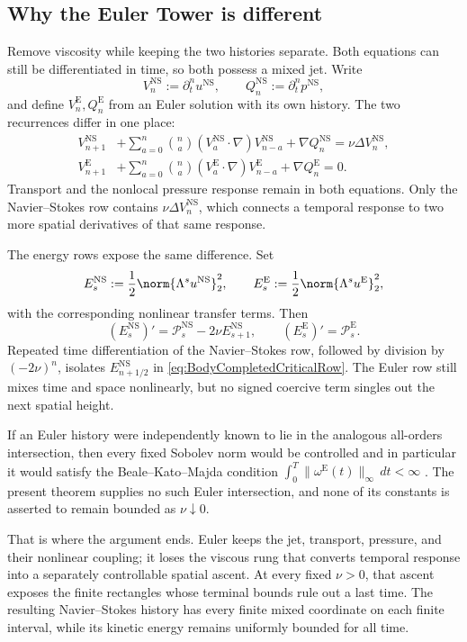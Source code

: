 \subsection{Why the Euler Tower is different}\label{sub:WhyTheEulerTowerIsDifferent}

Remove viscosity while keeping the two histories separate.  Both equations can
still be differentiated in time, so both possess a mixed jet.  Write
\[
  V_n^{\mathrm{NS}}:=\partial_t^nu^{\mathrm{NS}},
  \qquad
  Q_n^{\mathrm{NS}}:=\partial_t^np^{\mathrm{NS}},
\]
and define \(V_n^{\mathrm E},Q_n^{\mathrm E}\) from an Euler solution with its
own history.  The two recurrences differ in one place:
\begin{align}
  V_{n+1}^{\mathrm{NS}}
  &+
  \sum_{a=0}^{n}\binom{n}{a}
  (V_a^{\mathrm{NS}}\cdot\nabla)V_{n-a}^{\mathrm{NS}}
  +\nabla Q_n^{\mathrm{NS}}
  =\nu\Delta V_n^{\mathrm{NS}},
  \label{eq:NSTemporalRecurrenceComparison}
  \\
  V_{n+1}^{\mathrm E}
  &+
  \sum_{a=0}^{n}\binom{n}{a}
  (V_a^{\mathrm E}\cdot\nabla)V_{n-a}^{\mathrm E}
  +\nabla Q_n^{\mathrm E}
  =0.
  \label{eq:EulerTemporalRecurrenceComparison}
\end{align}
Transport and the nonlocal pressure response remain in both equations.
Only the Navier--Stokes row contains \(\nu\Delta V_n^{\mathrm{NS}}\), which
connects a temporal response to two more spatial derivatives of that same
response.

The energy rows expose the same difference.  Set
\[
  E_s^{\mathrm{NS}}:=\frac12\norm{\Lambda^su^{\mathrm{NS}}}_2^2,
  \qquad
  E_s^{\mathrm E}:=\frac12\norm{\Lambda^su^{\mathrm E}}_2^2,
\]
with the corresponding nonlinear transfer terms.  Then
\begin{equation}\label{eq:NSEulerEnergyComparison}
  (E_s^{\mathrm{NS}})'
  =\mathcal P_s^{\mathrm{NS}}-2\nu E_{s+1}^{\mathrm{NS}},
  \qquad
  (E_s^{\mathrm E})'
  =\mathcal P_s^{\mathrm E}.
\end{equation}
Repeated time differentiation of the Navier--Stokes row, followed by division
by \((-2\nu)^n\), isolates \(E_{n+1/2}^{\mathrm{NS}}\) in
\eqref{eq:BodyCompletedCriticalRow}.  The Euler row still mixes time and space
nonlinearly, but no signed coercive term singles out the next spatial height.

If an Euler history were independently known to lie in the analogous
all-orders intersection, then every fixed Sobolev norm would be controlled and
in particular it would satisfy the Beale--Kato--Majda condition
\(\int_0^T\|\omega^{\mathrm E}(t)\|_\infty\,dt<\infty\)
\parencite{BealeKatoMajda1984}.  The present theorem supplies no such Euler
intersection, and none of its constants is asserted to remain bounded as
\(\nu\downarrow0\).

That is where the argument ends.  Euler keeps the jet, transport, pressure, and
their nonlinear coupling; it loses the viscous rung that converts temporal
response into a separately controllable spatial ascent.  At every fixed
\(\nu>0\), that ascent exposes the finite rectangles whose terminal bounds rule
out a last time.  The resulting Navier--Stokes history has every finite mixed
coordinate on each finite interval, while its kinetic energy remains uniformly
bounded for all time.
